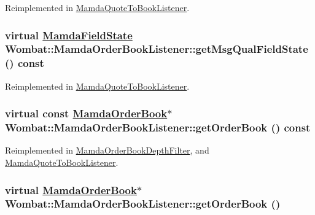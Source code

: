Reimplemented in \hyperlink{classMamdaQuoteToBookListener_3105e19fc56da0ddec1a79304a151a43}{Mamda\-Quote\-To\-Book\-Listener}.\hypertarget{classWombat_1_1MamdaOrderBookListener_0516e60cecd086e30781592f16110196}{
\subsubsection[getMsgQualFieldState]{\setlength{\rightskip}{0pt plus 5cm}virtual \hyperlink{namespaceWombat_93aac974f2ab713554fd12a1fa3b7d2a}{Mamda\-Field\-State} Wombat::Mamda\-Order\-Book\-Listener::get\-Msg\-Qual\-Field\-State () const}}
\label{classWombat_1_1MamdaOrderBookListener_0516e60cecd086e30781592f16110196}




Reimplemented in \hyperlink{classMamdaQuoteToBookListener_62ad9b9cfc10f553c2b39cd54610ff8c}{Mamda\-Quote\-To\-Book\-Listener}.\hypertarget{classWombat_1_1MamdaOrderBookListener_882be50b668154aed7f170dbb2f47d34}{
\subsubsection[getOrderBook]{\setlength{\rightskip}{0pt plus 5cm}virtual const \hyperlink{classWombat_1_1MamdaOrderBook}{Mamda\-Order\-Book}$\ast$ Wombat::Mamda\-Order\-Book\-Listener::get\-Order\-Book () const}}
\label{classWombat_1_1MamdaOrderBookListener_882be50b668154aed7f170dbb2f47d34}




Reimplemented in \hyperlink{classMamdaOrderBookDepthFilter_8ea01fc66c28b7ac4dbb3939e340aad0}{Mamda\-Order\-Book\-Depth\-Filter}, and \hyperlink{classMamdaQuoteToBookListener_e63faf479027ccc1c72b156847832c9d}{Mamda\-Quote\-To\-Book\-Listener}.\hypertarget{classWombat_1_1MamdaOrderBookListener_06ed6e6af962b6bee11d49bdc0c451dd}{
\subsubsection[getOrderBook]{\setlength{\rightskip}{0pt plus 5cm}virtual \hyperlink{classWombat_1_1MamdaOrderBook}{Mamda\-Order\-Book}$\ast$ Wombat::Mamda\-Order\-Book\-Listener::get\-Order\-Book ()}}
\label{classWombat_1_1MamdaOrderBookListener_06ed6e6af962b6bee11d49bdc0c451dd}


